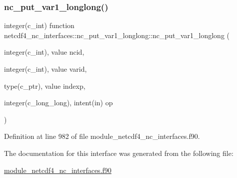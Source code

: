 \subsubsection{\texorpdfstring{nc\+\_\+put\+\_\+var1\+\_\+longlong()}{nc\_put\_var1\_longlong()}}
{\footnotesize\ttfamily integer(c\+\_\+int) function netcdf4\+\_\+nc\+\_\+interfaces\+::nc\+\_\+put\+\_\+var1\+\_\+longlong\+::nc\+\_\+put\+\_\+var1\+\_\+longlong (\begin{DoxyParamCaption}\item[{integer(c\+\_\+int), value}]{ncid,  }\item[{integer(c\+\_\+int), value}]{varid,  }\item[{type(c\+\_\+ptr), value}]{indexp,  }\item[{integer(c\+\_\+long\+\_\+long), intent(in)}]{op }\end{DoxyParamCaption})}



Definition at line 982 of file module\+\_\+netcdf4\+\_\+nc\+\_\+interfaces.\+f90.



The documentation for this interface was generated from the following file\+:\begin{DoxyCompactItemize}
\item 
\hyperlink{module__netcdf4__nc__interfaces_8f90}{module\+\_\+netcdf4\+\_\+nc\+\_\+interfaces.\+f90}\end{DoxyCompactItemize}
